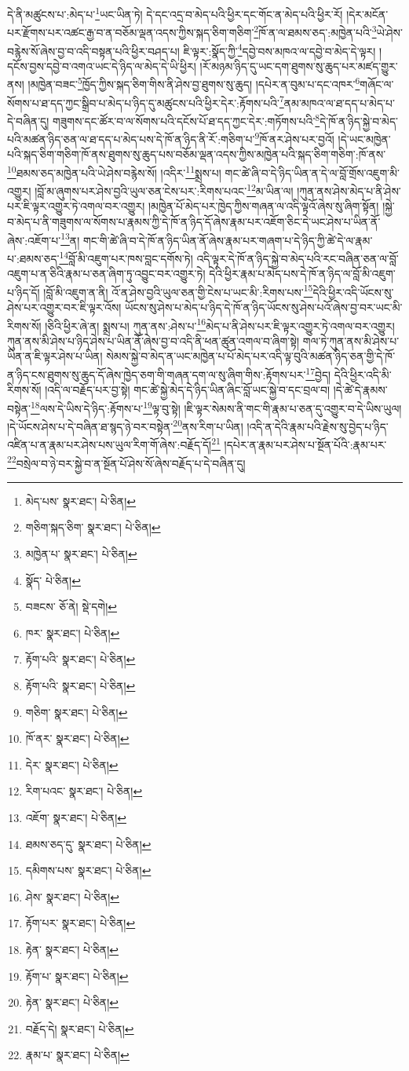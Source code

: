 དེ་ནི་མཚུངས་པ་:མེད་པ་\footnote{མེད་པས་  སྣར་ཐང་།  པེ་ཅིན། }ཡང་ཡིན་ཏེ། དེ་དང་འདྲ་བ་མེད་པའི་ཕྱིར་དང་གོང་ན་མེད་པའི་ཕྱིར་རོ། །དེར་མངོན་པར་རྫོགས་པར་འཚང་རྒྱ་བ་ན་བཅོམ་ལྡན་འདས་ཀྱིས་སྐད་ཅིག་གཅིག་\footnote{གཅིག་སྐད་ཅིག་  སྣར་ཐང་།  པེ་ཅིན། }ཁོ་ན་ལ་ཐམས་ཅད་:མཁྱེན་པའི་\footnote{མཁྱེན་པ་  སྣར་ཐང་།  པེ་ཅིན། }ཡེ་ཤེས་བརྙེས་སོ་ཞེས་བྱ་བ་འདི་བསྟན་པའི་ཕྱིར་བཤད་པ། ཇི་ལྟར་:སྣོད་ཀྱི་\footnote{སྣོད་  པེ་ཅིན། }དབྱེ་བས་མཁའ་ལ་དབྱེ་བ་མེད་དེ་ལྟར། །དངོས་བྱས་དབྱེ་བ་འགའ་ཡང་དེ་ཉིད་ལ་མེད་དེ་ཡི་ཕྱིར། །རོ་མཉམ་ཉིད་དུ་ཡང་དག་ཐུགས་སུ་ཆུད་པར་མཛད་གྱུར་ནས། །མཁྱེན་བཟང་\footnote{བཟངས་  ཅོ་ནེ།  སྡེ་དགེ། }ཁྱོད་ཀྱིས་སྐད་ཅིག་གིས་ནི་ཤེས་བྱ་ཐུགས་སུ་ཆུད། །དཔེར་ན་བུམ་པ་དང་འཁར་\footnote{ཁར་  སྣར་ཐང་།  པེ་ཅིན། }གཞོང་ལ་སོགས་པ་ཐ་དད་ཀྱང་སྒྲིབ་པ་མེད་པ་ཉིད་དུ་མཚུངས་པའི་ཕྱིར་དེར་:རྟོགས་པའི་\footnote{རྟོག་པའི་  སྣར་ཐང་།  པེ་ཅིན། }ནམ་མཁའ་ལ་ཐ་དད་པ་མེད་པ་དེ་བཞིན་དུ། གཟུགས་དང་ཚོར་བ་ལ་སོགས་པའི་དངོས་པོ་ཐ་དད་ཀྱང་དེར་:གཏོགས་པའི་\footnote{རྟོག་པའི་  སྣར་ཐང་།  པེ་ཅིན། }དེ་ཁོ་ན་ཉིད་སྐྱེ་བ་མེད་པའི་མཚན་ཉིད་ཅན་ལ་ཐ་དད་པ་མེད་པས་དེ་ཁོ་ན་ཉིད་ནི་རོ་:གཅིག་པ་\footnote{གཅིག་  སྣར་ཐང་།  པེ་ཅིན། }ཁོ་ནར་ཤེས་པར་བྱའོ། །དེ་ཡང་མཁྱེན་པའི་སྐད་ཅིག་གཅིག་ཁོ་ནས་ཐུགས་སུ་ཆུད་པས་བཅོམ་ལྡན་འདས་ཀྱིས་མཁྱེན་པའི་སྐད་ཅིག་གཅིག་:ཁོ་ནས་\footnote{ཁོ་ནར་  སྣར་ཐང་།  པེ་ཅིན། }ཐམས་ཅད་མཁྱེན་པའི་ཡེ་ཤེས་བརྙེས་སོ། །འདིར་\footnote{དེར་  སྣར་ཐང་།  པེ་ཅིན། }སྨྲས་པ། གང་ཚེ་ཞི་བ་དེ་ཉིད་ཡིན་ན་དེ་ལ་བློ་གྲོས་འཇུག་མི་འགྱུར། །བློ་མ་ཞུགས་པར་ཤེས་བྱའི་ཡུལ་ཅན་ངེས་པར་:རིགས་པའང་\footnote{རིག་པའང་  སྣར་ཐང་།  པེ་ཅིན། }མ་ཡིན་ལ། །ཀུན་ནས་ཤེས་མེད་པ་ནི་ཤེས་པར་ཇི་ལྟར་འགྱུར་ཏེ་འགལ་བར་འགྱུར། །མཁྱེན་པོ་མེད་པར་ཁྱེད་ཀྱིས་གཞན་ལ་འདི་ལྟའོ་ཞེས་སུ་ཞིག་སྟོན། །སྐྱེ་བ་མེད་པ་ནི་གཟུགས་ལ་སོགས་པ་རྣམས་ཀྱི་དེ་ཁོ་ན་ཉིད་དོ་ཞེས་རྣམ་པར་འཇོག་ཅིང་དེ་ཡང་ཤེས་པ་ཡིན་ནོ་ཞེས་:འཇོག་པ་\footnote{འཇོག་  སྣར་ཐང་།  པེ་ཅིན། }ན། གང་གི་ཚེ་ཞི་བ་དེ་ཁོ་ན་ཉིད་ཡིན་ནོ་ཞེས་རྣམ་པར་གཞག་པ་དེ་ཉིད་ཀྱི་ཚེ་དེ་ལ་རྣམ་པ་:ཐམས་ཅད་\footnote{ཐམས་ཅད་དུ་  སྣར་ཐང་།  པེ་ཅིན། }བློ་མི་འཇུག་པར་ཁས་བླང་དགོས་ཏེ། འདི་ལྟར་དེ་ཁོ་ན་ཉིད་སྐྱེ་བ་མེད་པའི་རང་བཞིན་ཅན་ལ་བློ་འཇུག་པ་ན་ཅིའི་རྣམ་པ་ཅན་ཞིག་ཏུ་འབྱུང་བར་འགྱུར་ཏེ། དེའི་ཕྱིར་རྣམ་པ་མེད་པས་དེ་ཁོ་ན་ཉིད་ལ་བློ་མི་འཇུག་པ་ཉིད་དོ། །བློ་མི་འཇུག་ན་ནི། འོ་ན་ཤེས་བྱའི་ཡུལ་ཅན་གྱི་ངེས་པ་ཡང་མི་:རིགས་པས་\footnote{དམིགས་པས་  སྣར་ཐང་།  པེ་ཅིན། }དེའི་ཕྱིར་འདི་ཡོངས་སུ་ཤེས་པར་འགྱུར་བར་ཇི་ལྟར་འོས། ཡོངས་སུ་ཤེས་པ་མེད་པ་ཉིད་དེ་ཁོ་ན་ཉིད་ཡོངས་སུ་ཤེས་པའོ་ཞེས་བྱ་བར་ཡང་མི་རིགས་སོ། །ཅིའི་ཕྱིར་ཞེ་ན། སྨྲས་པ། ཀུན་ནས་:ཤེས་པ་\footnote{ཤེས་  སྣར་ཐང་།  པེ་ཅིན། }མེད་པ་ནི་ཤེས་པར་ཇི་ལྟར་འགྱུར་ཏེ་འགལ་བར་འགྱུར། ཀུན་ནས་མི་ཤེས་པ་ཉིད་ཤེས་པ་ཡིན་ནོ་ཞེས་བྱ་བ་འདི་ནི་ཕན་ཚུན་འགལ་བ་ཞིག་སྟེ། གལ་ཏེ་ཀུན་ནས་མི་ཤེས་པ་ཡིན་ན་ཇི་ལྟར་ཤེས་པ་ཡིན། སེམས་སྐྱེ་བ་མེད་ན་ཡང་མཁྱེན་པ་པོ་མེད་པར་འདི་ལྟ་བུའི་མཚན་ཉིད་ཅན་གྱི་དེ་ཁོ་ན་ཉིད་ངས་ཐུགས་སུ་ཆུད་དོ་ཞེས་ཁྱེད་ཅག་གི་གཞན་དག་ལ་སུ་ཞིག་གིས་:རྟོགས་པར་\footnote{རྟོག་པར་  སྣར་ཐང་།  པེ་ཅིན། }བྱེད། དེའི་ཕྱིར་འདི་མི་རིགས་སོ། །འདི་ལ་བརྗོད་པར་བྱ་སྟེ། གང་ཚེ་སྐྱེ་མེད་དེ་ཉིད་ཡིན་ཞིང་བློ་ཡང་སྐྱེ་བ་དང་བྲལ་བ། །དེ་ཚེ་དེ་རྣམས་བསྟེན་\footnote{རྟེན་  སྣར་ཐང་།  པེ་ཅིན། }ལས་དེ་ཡིས་དེ་ཉིད་:རྟོགས་པ་\footnote{རྟོག་པ་  སྣར་ཐང་།  པེ་ཅིན། }ལྟ་བུ་སྟེ། །ཇི་ལྟར་སེམས་ནི་གང་གི་རྣམ་པ་ཅན་དུ་འགྱུར་བ་དེ་ཡིས་ཡུལ། །དེ་ཡོངས་ཤེས་པ་དེ་བཞིན་ཐ་སྙད་ཉེ་བར་བསྟེན་\footnote{རྟེན་  སྣར་ཐང་།  པེ་ཅིན། }ནས་རིག་པ་ཡིན། །འདི་ན་དེའི་རྣམ་པའི་རྗེས་སུ་བྱེད་པ་ཉིད་འཛིན་པ་ན་རྣམ་པར་ཤེས་པས་ཡུལ་རིག་གོ་ཞེས་:བརྗོད་དོ།\footnote{བརྗོད་དེ།  སྣར་ཐང་།  པེ་ཅིན། } །དཔེར་ན་རྣམ་པར་ཤེས་པ་སྔོན་པོའི་:རྣམ་པར་\footnote{རྣམ་པ་  སྣར་ཐང་།  པེ་ཅིན། }བསྲེལ་བ་ཉེ་བར་སྐྱེ་བ་ན་སྔོན་པོ་ཤེས་སོ་ཞེས་བརྗོད་པ་དེ་བཞིན་དུ། 